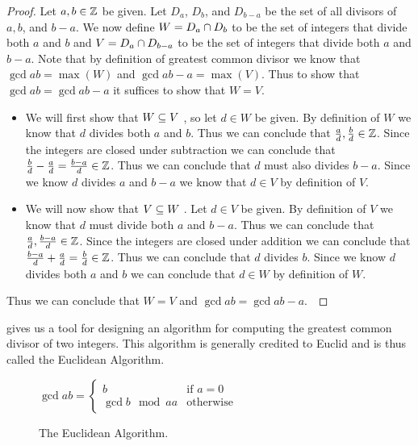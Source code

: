         \begin{proof}
            Let $a, b \in \mathbb{Z}$ be given. Let $D_a$, $D_b$,  and $D_{b - a}$ be the set of all divisors
            of $a, b$, and $b - a$. We now define $W = D_a \cap D_b$ to be the set of integers that
            divide both $a$ and $b$ and $V = D_a \cap D_{b - a}$ to be the set of integers that
            divide both $a$ and $b - a$. Note that by definition of greatest common divisor we know that
            $\gcd{a}{b} = \max(W)$ and $\gcd{a}{b - a} = \max(V)$. Thus to show that $\gcd{a}{b} =
            \gcd{a}{b - a}$ it suffices to show that $W = V$.
            \begin{itemize}
                \item
                    We will first show that $W \subseteq V \ $, so let $d \in W$ be given. By definition
                    of $W$ we know that $d$ divides both $a$ and $b$. Thus we can conclude that
                    $\frac{a}{d}, \frac{b}{d} \in \mathbb{Z}$. Since the integers are closed under subtraction
                    we can conclude that $\frac{b}{d} - \frac{a}{d} = \frac{b - a}{d} \in \mathbb{Z}$.
                    Thus we can conclude that $d$ must also divides $b - a$. Since we know $d$ divides
                    $a$ and $b - a$ we know that $d \in V$ by definition of $V$.
                \item
                    We will now show that $V \subseteq W \ $. Let $d \in V$ be given. By definition of $V$
                    we know that $d$ must divide both $a$ and $b - a$. Thus we can conclude that
                    $\frac{a}{d}, \frac{b - a}{d} \in \mathbb{Z}$. Since the integers are closed under
                    addition we can conclude that $\frac{b - a}{d} + \frac{a}{d} = \frac{b}{d} \in \mathbb{Z}$.
                    Thus we can conclude that $d$ divides $b$. Since we know $d$ divides both $a$
                    and $b$ we can conclude that $d \in W$ by definition of $W$.
            \end{itemize}
            Thus we can conclude that $W = V$ and $\gcd{a}{b} = \gcd{a}{b - a}$.~\QED
        \end{proof}
        \begin{algorithm}
             gives us a tool for designing an algorithm for computing the greatest
            common divisor of two integers. This algorithm is generally credited to Euclid and is thus called
            the Euclidean Algorithm.
            \begin{figure}[H]
                \centering
                $\gcd{a}{b} = \left\{\begin{array}{ll}
                    b & \mbox{if } a = 0 \\
                    \gcd{b\mod a}{a} & \mbox{otherwise}
                \end{array}\right.$
                \caption{The Euclidean Algorithm.}
            \end{figure}
        \end{algorithm}
